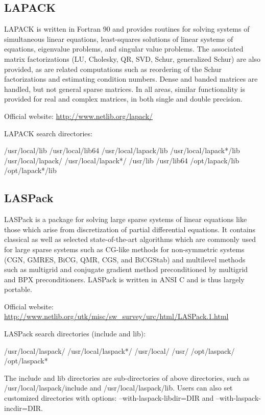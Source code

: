 \subsection{LAPACK}
LAPACK is written in Fortran 90 and provides routines for solving systems of simultaneous linear equations, least-squares solutions of linear systems of equations, eigenvalue problems, and singular value problems. The associated matrix factorizations (LU, Cholesky, QR, SVD, Schur, generalized Schur) are also provided, as are related computations such as reordering of the Schur factorizations and estimating condition numbers. Dense and banded matrices are handled, but not general sparse matrices. In all areas, similar functionality is provided for real and complex matrices, in both single and double precision.

Official website: \url{http://www.netlib.org/lapack/}

LAPACK search directories:
\begin{evb}
/usr/local/lib
/usr/local/lib64
/usr/local/lapack/lib
/usr/local/lapack*/lib
/usr/local/lapack/
/usr/local/lapack*/
/usr/lib
/usr/lib64
/opt/lapack/lib
/opt/lapack*/lib
\end{evb}

\subsection{LASPack}
LASPack is a package for solving large sparse systems of linear equations like those which arise from discretization of partial differential equations.  It contains classical as well as selected state-of-the-art algorithms which are commonly used for large sparse systems such as CG-like methods for non-symmetric systems (CGN, GMRES, BiCG, QMR, CGS, and BiCGStab) and multilevel methods such as multigrid and conjugate gradient method preconditioned by multigrid and BPX preconditioners.  LASPack is written in ANSI C and is thus largely portable.  

Official website: {\small \url{http://www.netlib.org/utk/misc/sw_survey/urc/html/LASPack.1.html}}

LASPack search directories (include and lib):
\begin{evb}
/usr/local/laspack/
/usr/local/laspack*/
/usr/local/
/usr/
/opt/laspack/
/opt/laspack*
\end{evb}
The include and lib directories are sub-directories of above directories, such as /usr/local/laspack/include and /usr/local/laspack/lib. Users can also set customized directories with options: --with-laspack-libdir=DIR and --with-laspack-incdir=DIR.

